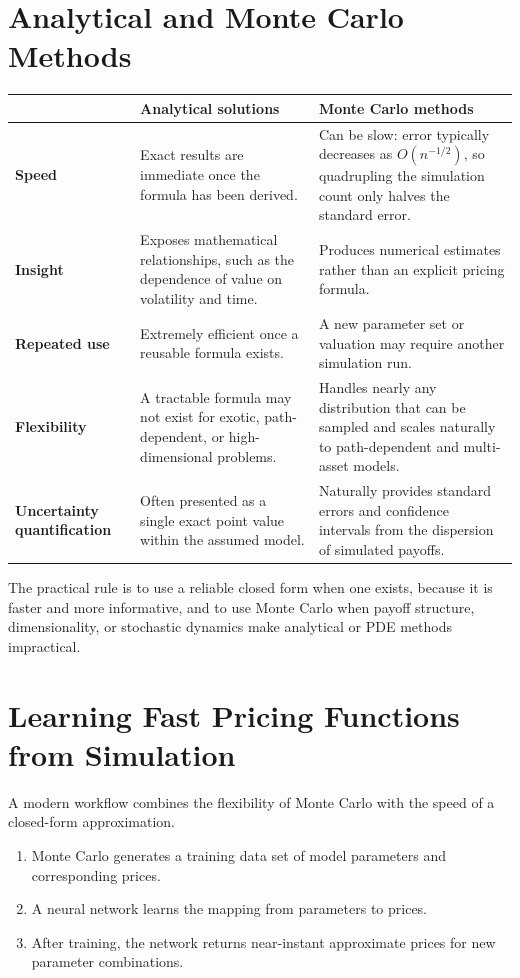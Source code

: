 \documentclass[12pt,openany]{book}
\theoremstyle{definition}
\theoremstyle{remark}
\begin{document}
\section{Analytical and Monte Carlo Methods}

\begin{longtable}{@{}L{0.16\textwidth}L{0.37\textwidth}L{0.37\textwidth}@{}}
\toprule
& \textbf{Analytical solutions} & \textbf{Monte Carlo methods}\\
\midrule
\textbf{Speed}
& Exact results are immediate once the formula has been derived.
& Can be slow: error typically decreases as \(O(n^{-1/2})\), so quadrupling
the simulation count only halves the standard error.\\

\textbf{Insight}
& Exposes mathematical relationships, such as the dependence of value on
volatility and time.
& Produces numerical estimates rather than an explicit pricing formula.\\

\textbf{Repeated use}
& Extremely efficient once a reusable formula exists.
& A new parameter set or valuation may require another simulation run.\\

\textbf{Flexibility}
& A tractable formula may not exist for exotic, path-dependent, or
high-dimensional problems.
& Handles nearly any distribution that can be sampled and scales naturally
to path-dependent and multi-asset models.\\

\textbf{Uncertainty quantification}
& Often presented as a single exact point value within the assumed model.
& Naturally provides standard errors and confidence intervals from the
dispersion of simulated payoffs.\\
\bottomrule
\end{longtable}

The practical rule is to use a reliable closed form when one exists, because
it is faster and more informative, and to use Monte Carlo when payoff
structure, dimensionality, or stochastic dynamics make analytical or PDE
methods impractical.

\section{Learning Fast Pricing Functions from Simulation}

A modern workflow combines the flexibility of Monte Carlo with the speed of
a closed-form approximation.
\begin{enumerate}
    \item Monte Carlo generates a training data set of model parameters and
    corresponding prices.
    \item A neural network learns the mapping from parameters to prices.
    \item After training, the network returns near-instant approximate prices
    for new parameter combinations.
\end{enumerate}
\end{document}
